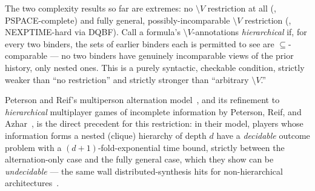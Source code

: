 \begin{remark}
\label{rem:hierarchical-if}
The two complexity results so far are extremes: no $\setminus V$ restriction
at all (, PSPACE-complete) and fully general,
possibly-incomparable $\setminus V$ restriction (,
NEXPTIME-hard via DQBF). Call a formula's $\setminus V$-annotations
\emph{hierarchical} if, for every two binders, the sets of earlier binders
each is permitted to see are $\subseteq$-comparable --- no two binders have
genuinely incomparable views of the prior history, only nested ones. This is
a purely syntactic, checkable condition, strictly weaker than ``no
restriction'' and strictly stronger than ``arbitrary $\setminus V$.''

Peterson and Reif's multiperson alternation
model~\cite{PetersonReif1979MultiplePersonAlternation}, and its refinement to
\emph{hierarchical} multiplayer games of incomplete information by Peterson,
Reif, and
Azhar~\cite{PetersonReifAzhar2001LowerBounds,PetersonReifAzhar2002DecisionAlgorithms},
is the direct precedent for this restriction: in their model, players whose
information forms a nested (clique) hierarchy of depth $d$ have a
\emph{decidable} outcome problem with a $(d{+}1)$-fold-exponential time
bound, strictly between the alternation-only case and the fully general
case, which they show can be \emph{undecidable} --- the same wall
distributed-synthesis hits for non-hierarchical
architectures~\cite{PnueliRosner1990DistributedHard}.


\end{remark}
